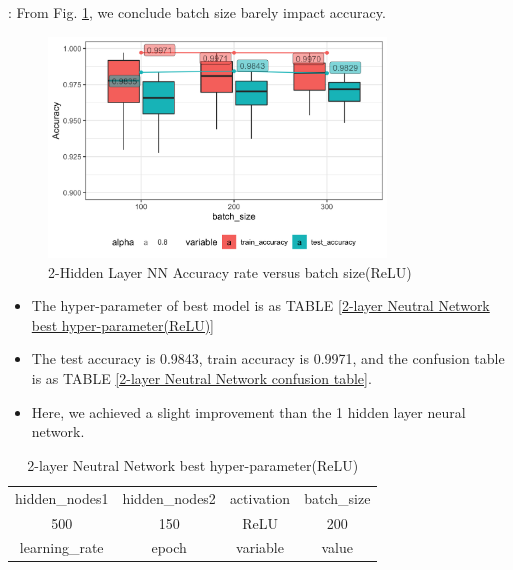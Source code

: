 \documentclass[8pt]{beamer}
\begin{document}
\begin{frame}[allowframebreaks]{\secname : \subsecname}
From Fig. \ref{2-Hidden Layer Neural Network Accuracy rate versus batch size(ReLU)}, we conclude batch size barely impact accuracy.
\begin{figure}[htbp]
\centerline{\includegraphics[width=0.8\textwidth]{figure/2-Hidden Layer Neural Network Accuracy rate versus batch_size.png}}
\caption{2-Hidden Layer NN Accuracy rate versus batch size(ReLU)}
\label{2-Hidden Layer Neural Network Accuracy rate versus batch size(ReLU)}
\vspace{-1.5em}
\end{figure}




\begin{itemize}
  \item The hyper-parameter of best model is as TABLE \ref{2-layer Neutral Network best hyper-parameter(ReLU)}
  \item The test accuracy is 0.9843, train accuracy is 0.9971, and the confusion table is as TABLE \ref{2-layer Neutral Network confusion table}. 
  \item Here, we achieved a slight improvement than the 1 hidden layer neural network.
\end{itemize}

\begin{table}[htbp]
\tiny
\centering
\caption{2-layer Neutral Network best hyper-parameter(ReLU)}
\begin{tabular}{|c|c|c|c|}
  \hline
 hidden\_nodes1& hidden\_nodes2 & activation & batch\_size  \\

500& 150& ReLU & 200  \\
  \hline
learning\_rate & epoch & variable & value \\ 


\end{tabular}
\end{table}
\end{frame}
\end{document}
